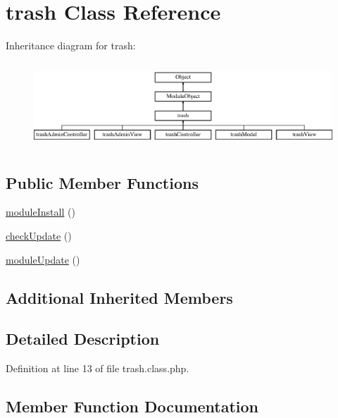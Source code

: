 \hypertarget{classtrash}{}\section{trash Class Reference}
\label{classtrash}
Inheritance diagram for trash\+:\begin{figure}[H]
\begin{center}
\leavevmode
\includegraphics[height=3.223022cm]{classtrash}
\end{center}
\end{figure}
\subsection*{Public Member Functions}
\begin{DoxyCompactItemize}
\item 
\hyperlink{classtrash_aab8bc21b844b643ba68aa2c0ef6fcc10}{module\+Install} ()
\item 
\hyperlink{classtrash_afd6b11671a875ff9802a93d435963e77}{check\+Update} ()
\item 
\hyperlink{classtrash_a895b71f0ed15178c9aa04f2d0738aa31}{module\+Update} ()
\end{DoxyCompactItemize}
\subsection*{Additional Inherited Members}


\subsection{Detailed Description}


Definition at line 13 of file trash.\+class.\+php.



\subsection{Member Function Documentation}
\hypertarget{classtrash_afd6b11671a875ff9802a93d435963e77}{}\label{classtrash_afd6b11671a875ff9802a93d435963e77} 
